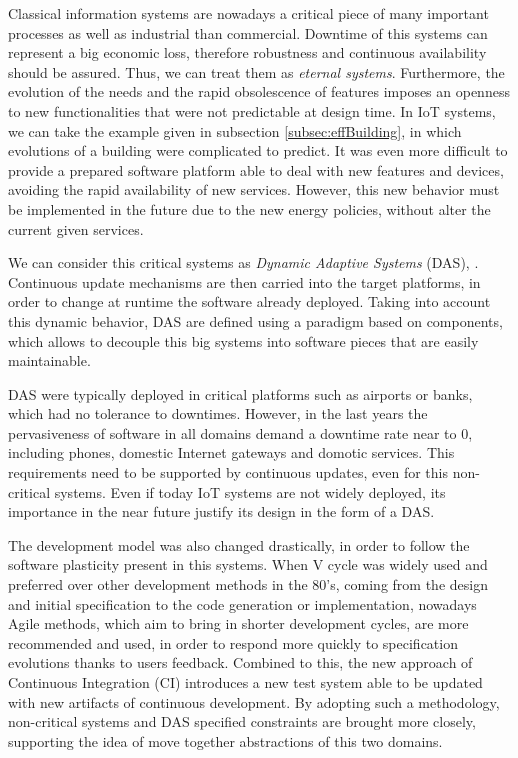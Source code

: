 Classical information systems are nowadays a critical piece of many important processes as well as industrial than commercial.
Downtime of this systems can represent a big economic loss, therefore robustness and continuous availability should be assured.
Thus, we can treat them as \textit{eternal systems}.
Furthermore, the evolution of the needs and the rapid obsolescence of features imposes an openness to new functionalities that were not predictable at design time.
In IoT systems, we can take the example given in subsection \ref{subsec:effBuilding}, in which evolutions of a building were complicated to predict.
It was even more difficult to provide a prepared software platform able to deal with new features and devices, avoiding the rapid availability of new services.
However, this new behavior must be implemented in the future due to the new energy policies, without alter the current given services.

We can consider this critical systems as \textit{Dynamic Adaptive Systems} (DAS)\cite{mckinley2004composing}, \cite{morin2009taming}.
Continuous update mechanisms are then carried into the target platforms, in order to change at runtime the software already deployed.
Taking into account this dynamic behavior, DAS are defined using a paradigm based on components, which allows to decouple this big systems into software pieces that are easily maintainable\cite{crnkovic2002building}.

DAS were typically deployed in critical platforms such as airports or banks, which had no tolerance to downtimes.
However, in the last years the pervasiveness of software in all domains demand a downtime rate near to 0, including phones, domestic Internet gateways and domotic services\cite{nain2008using}.
This requirements need to be supported by continuous updates, even for this non-critical systems.
Even if today IoT systems are not widely deployed, its importance in the near future justify its design in the form of a DAS.

The development model was also changed drastically, in order to follow the software plasticity present in this systems.
When V cycle was widely used and preferred over other development methods in the 80's, coming from the design and initial specification to the code generation or implementation, nowadays Agile methods\cite{stolberg2009enabling}, which aim to bring in shorter development cycles, are more recommended and used, in order to respond more quickly to specification evolutions thanks to users feedback.
Combined to this, the new approach of Continuous Integration (CI) introduces a new test system able to be updated with new artifacts of continuous development.
By adopting such a methodology, non-critical systems and DAS specified constraints are brought more closely, supporting the idea of move together abstractions of this two domains.

